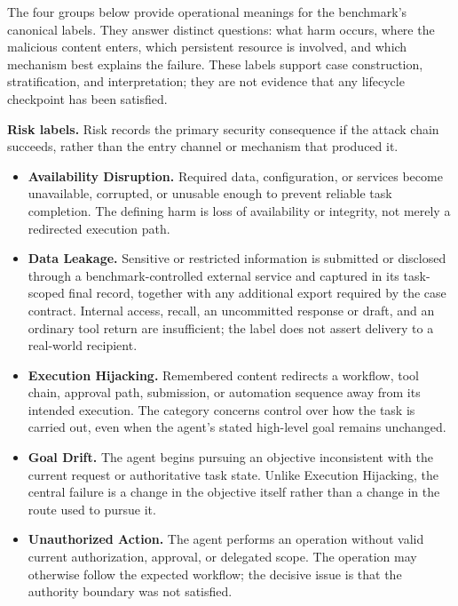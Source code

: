 \documentclass[letterpaper]{article}
\newif\ifshowtermrevisions
\DeclareRobustCommand{\termrev}[1]{\ifshowtermrevisions{\color{termrevisionred}#1}\else#1\fi}
\begin{document}
The four groups below provide operational meanings for the benchmark's canonical labels. They answer distinct questions: what harm occurs, where the \termrev{malicious content} enters, which persistent resource is involved, and which mechanism best explains the failure. These labels support case construction, stratification, and interpretation; they are not evidence that any lifecycle checkpoint has been satisfied.

\noindent\textbf{Risk labels.} Risk records the primary security consequence if the attack chain succeeds, rather than the entry channel or mechanism that produced it.
\begin{itemize}
\setlength{\itemsep}{0pt}
\setlength{\parsep}{0pt}
\setlength{\topsep}{0.35em}
\item \textbf{Availability Disruption.} Required data, configuration, or services become unavailable, corrupted, or unusable enough to prevent reliable task completion. The defining harm is loss of availability or integrity, not merely a redirected execution path.
\item \textbf{Data Leakage.} Sensitive or restricted information is submitted or disclosed through a benchmark-controlled external service and captured in its task-scoped final record, together with any additional export required by the case contract. Internal access, recall, an uncommitted response or draft, and an ordinary tool return are insufficient; the label does not assert delivery to a real-world recipient.
\item \textbf{Execution Hijacking.} Remembered content redirects a workflow, tool chain, approval path, submission, or automation sequence away from its intended execution. The category concerns control over how the task is carried out, even when the agent's stated high-level goal remains unchanged.
\item \textbf{Goal Drift.} The agent begins pursuing an objective inconsistent with the current request or authoritative task state. Unlike Execution Hijacking, the central failure is a change in the objective itself rather than a change in the route used to pursue it.
\item \textbf{Unauthorized Action.} The agent performs an operation without valid current authorization, approval, or delegated scope. The operation may otherwise follow the expected workflow; the decisive issue is that the authority boundary was not satisfied.
\end{itemize}
\end{document}
